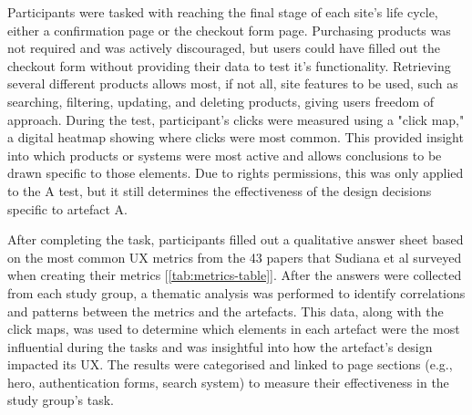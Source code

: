 \documentclass[article]{IEEEtran}
\begin{document}
        Participants were tasked with reaching the final stage of each site's life cycle, either a confirmation page or the checkout form page. Purchasing products was not required and was actively discouraged, but users could have filled out the checkout form without providing their data to test it's functionality. Retrieving several different products allows most, if not all, site features to be used, such as searching, filtering, updating, and deleting products, giving users freedom of approach. During the test, participant's clicks were measured using a "click map," a digital heatmap showing where clicks were most common. This provided insight into which products or systems were most active and allows conclusions to be drawn specific to those elements. Due to rights permissions, this was only applied to the A test, but it still determines the effectiveness of the design decisions specific to artefact A.
        
        After completing the task, participants filled out a qualitative answer sheet based on the most common UX metrics from the 43 papers that Sudiana et al \cite{sudiana} surveyed when creating their metrics [\autoref{tab:metrics-table}]. After the answers were collected from each study group, a thematic analysis was performed to identify correlations and patterns between the metrics and the artefacts. This data, along with the click maps, was used to determine which elements in each artefact were the most influential during the tasks and was insightful into how the artefact's design impacted its UX. The results were categorised and linked to page sections (e.g., hero, authentication forms, search system) to measure their effectiveness in the study group's task.
\end{document}
